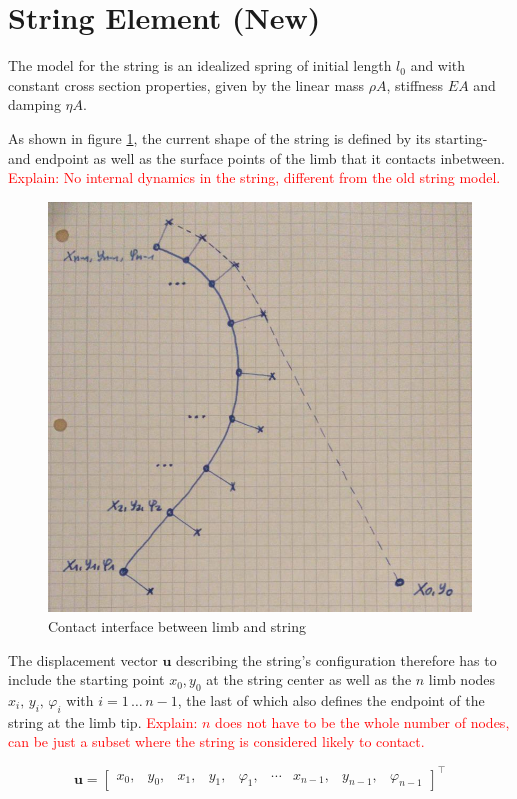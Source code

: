 \newpage
\section{String Element (New)}

The model for the string is an idealized spring of initial length $l_{0}$ and with constant cross section properties, given by the linear mass $\rho A$, stiffness $EA$ and damping $\eta A$.

As shown in figure \ref{fig:elements:string-element}, the current shape of the string is defined by its starting- and endpoint as well as the surface points of the limb that it contacts inbetween.
\textcolor{red}{Explain: No internal dynamics in the string, different from the old string model.}

\begin{figure}[h]
\centering
\includegraphics[width=0.5\linewidth]{figures/elements/string-element-new.jpg}
\caption{Contact interface between limb and string}
\label{fig:elements:string-element}
\end{figure}

The displacement vector $\boldsymbol{u}$ describing the string's configuration therefore has to include the starting point $x_{0}, y_{0}$ at the string center as well as the $n$ limb nodes $x_{i},\,y_{i},\,\varphi_{i}$ with $i = 1\,\ldots\,n-1$, the last of which also defines the endpoint of the string at the limb tip.
\textcolor{red}{Explain: $n$ does not have to be the whole number of nodes, can be just a subset where the string is considered likely to contact.}

\begin{equation}
\boldsymbol{u} = \begin{bmatrix}
x_{0}, & y_{0}, & x_{1}, & y_{1}, & \varphi_{1}, & \cdots & x_{n-1}, & y_{n-1}, & \varphi_{n-1}
\end{bmatrix}^\intercal
\end{equation}


